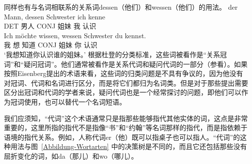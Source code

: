 同样也有与名词相联系的关系词dessen（他们）和wessen（他们）的用法。
\eal
\ex 
\gll der Mann, dessen Schwester ich kenne\\
	 DET 男人 CONJ 姐妹 我 认识\\
\ex 
\gll Ich möchte wissen, wessen Schwester du kennst.\\
	 我 想 知道 CONJ 姐妹 你 认识\\
\glt `我想知道你认识谁的姐妹。'
\zl
根据杜登的分类标准，这些词被看作是“关系冠词”和“疑问冠词”。他们通常被看作是关系代词和疑问代词的一部分（参看）。如果按照Eisenberg提出的术语来看，这些词的归类问题是不具有争议的，因为他没有对冠词、代词和名词进行区分，而是将它们都归为名词类。但是对于那些提出需要区分出冠词和代词的学者来说，疑问代词也是一个经常探讨的问题，即他们可以作为冠词使用，也可以替代一个名词短语。

我们应须知，“代词”这个术语通常只是指那些能够指代其他实体的词，这点是非常重要的，这里所指的指代不是指像“书”和“约翰”等名词那样的指代，而是指依赖于语境的指代关系。例如，人称代词er（他）既可以指桌子也可以指人。“代词”的这种用法与图~\ref{Abbildung-Wortarten} 中的决策树是不同的，而且它还包括那些没有屈折变化的词，如da（那儿）和wo（哪儿）。

